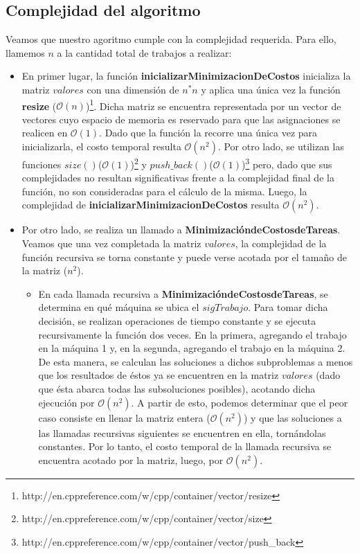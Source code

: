\subsection{Complejidad del algoritmo}

Veamos que nuestro agoritmo cumple con la complejidad requerida. Para ello, llamemos $n$ a la cantidad total de trabajos a realizar:
\begin{itemize}
\item En primer lugar, la función \textbf{inicializarMinimizacionDeCostos} inicializa la matriz $valores$ con una dimensión de $n^*n$ y aplica una única vez la función \textbf{resize} ($\mathcal{O}(n)$)\footnote{http://en.cppreference.com/w/cpp/container/vector/resize}. Dicha matriz se encuentra representada por un vector de vectores cuyo espacio de memoria es reservado para que las asignaciones se realicen en $\mathcal{O}(1)$. Dado que la función la recorre una única vez para inicializarla, el costo temporal resulta $\mathcal{O}(n^{2})$. Por otro lado, se utilizan las funciones $size()$($\mathcal{O}(1)$)\footnote{http://en.cppreference.com/w/cpp/container/vector/size} y $push\_back()$($\mathcal{O}(1)$)\footnote{http://en.cppreference.com/w/cpp/container/vector/push\_back} pero, dado que sus complejidades no resultan significativas frente a la complejidad final de la función, no son consideradas para el cálculo de la misma. Luego, la complejidad de \textbf{inicializarMinimizacionDeCostos} resulta $\mathcal{O}(n^{2})$.

\item Por otro lado, se realiza un llamado a \textbf{MinimizacióndeCostosdeTareas}. Veamos que una vez completada la matriz $valores$, la complejidad de la función recursiva se torna constante y puede verse acotada por el tamaño de la matriz ($n^{2}$).
\begin{itemize}
\item En cada llamada recursiva a \textbf{MinimizacióndeCostosdeTareas}, se determina en qué máquina se ubica el $sigTrabajo$. Para tomar dicha decisión, se realizan operaciones de tiempo constante y se ejecuta recursivamente la función dos veces. En la primera, agregando el trabajo en la máquina 1 y, en la segunda, agregando el trabajo en la máquina 2. De esta manera, se calculan las soluciones a dichos subproblemas a menos que los resultados de éstos ya se encuentren en la matriz $valores$ (dado que ésta abarca todas las subsoluciones posibles), acotando dicha ejecución por $\mathcal{O}(n^{2})$. A partir de esto, podemos determinar que el peor caso consiste en llenar la matriz entera ($\mathcal{O}(n^{2})$) y que las soluciones a las llamadas recursivas siguientes se encuentren en ella, tornándolas constantes. Por lo tanto, el costo temporal de la llamada recursiva se encuentra acotado por la matriz, luego, por $\mathcal{O}(n^{2})$. 


\end{itemize}
\end{itemize}
